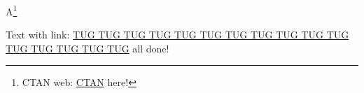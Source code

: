 \documentclass[dvipdfmx]{article}
\begin{document}
A\footnote{CTAN web: \href{https://ctan.org/}{CTAN} here!}
\vspace*{41\baselineskip}

Text with link: \href{https://tug.org/}{TUG TUG TUG TUG
TUG TUG TUG TUG TUG TUG TUG TUG TUG TUG TUG TUG} all done!
\end{document}
